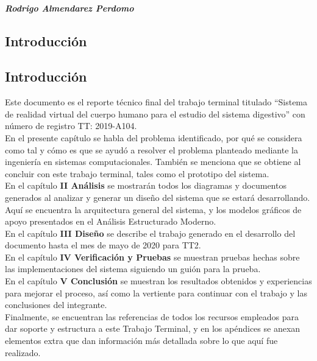 \documentclass[11pt,letter]{report}
\begin{document}
\paragraph{Rodrigo Almendarez Perdomo}
\vfill

\tableofcontents

\begin{center}
\chapter{Introducci\'on}
\end{center}

\newpage 
\section*{Introducci\'on}

Este documento es el reporte técnico final del trabajo terminal titulado “Sistema de realidad virtual del cuerpo humano para el estudio del sistema digestivo” con número de registro TT: 2019-A104.\\
\newline
En el presente capítulo se habla del problema identificado, por qué se considera como tal y cómo es que se ayudó a resolver el problema planteado mediante la ingeniería en sistemas computacionales. También se menciona que se obtiene al concluir con este trabajo terminal, tales como el prototipo del sistema.\\
\newline
En el capítulo \textbf{II Análisis} se mostrarán todos los diagramas y documentos generados al analizar y generar un diseño del sistema que se estará desarrollando. Aquí se encuentra la arquitectura general del sistema, y los modelos gráficos de apoyo presentados en el Análisis Estructurado Moderno.\\
\newline
En el capítulo \textbf{III Diseño} se describe el trabajo generado en el desarrollo del documento hasta el mes de mayo de 2020 para TT2.\\
\newline
En el capítulo \textbf{IV Verificación y Pruebas} se muestran pruebas hechas sobre las implementaciones del sistema siguiendo un guión para la prueba.
 \newline\\
En el capítulo \textbf{V Conclusión} se muestran los resultados obtenidos y experiencias para mejorar el proceso, así como la vertiente para continuar con el trabajo y las conclusiones del integrante.
\newline\\
Finalmente, se encuentran las referencias de todos los recursos empleados para dar soporte y estructura a este Trabajo Terminal, y en los apéndices se anexan elementos extra que dan información más detallada sobre lo que aquí fue realizado.\\
 
\end{document}
